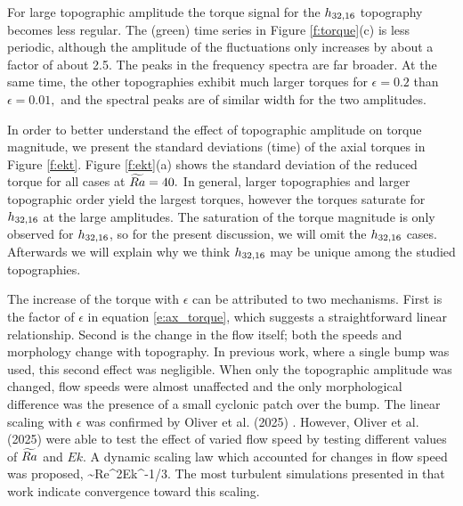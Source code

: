 For large topographic amplitude the torque signal for the $h_{32,16}$ topography becomes less regular.
The (green) time series in Figure \ref{f:torque}(c) is less periodic, although the amplitude of the fluctuations only increases by about a factor of about 2.5. The peaks in the frequency spectra are far broader. 
At the same time, the other topographies exhibit much larger torques for $\epsilon  = 0.2$ than $\epsilon  = 0.01,$ and the spectral peaks are of similar width for the two amplitudes.

In order to better understand the effect of topographic amplitude on torque magnitude, we present the standard deviations (time) of the axial torques in Figure \ref{f:ekt}. 
Figure \ref{f:ekt}(a) shows the standard deviation of the reduced torque for all cases at $\widetilde{Ra} = 40.$ In general, larger topographies and larger topographic order yield the largest torques, however the torques saturate for $h_{32,16}$ at the large amplitudes. The saturation of the torque magnitude is only observed for $h_{32,16}$, so for the present discussion, we will omit the $h_{32,16}$ cases. Afterwards we will explain why we think $h_{32,16}$ may be unique among the studied topographies. 

The increase of the torque with $\epsilon$ can be attributed to two mechanisms. First is the factor of $\epsilon$ in equation \eqref{e:ax_torque}, which suggests a straightforward linear relationship. Second is the change in the flow itself; both the speeds and morphology change with topography. 
In previous work, where a single bump was used, this second effect was negligible. When only the topographic amplitude was changed, flow speeds were almost unaffected and the only morphological difference was the presence of a small cyclonic patch over the bump. The linear scaling with $\epsilon$ was confirmed by Oliver et al. (2025) \citep{tO25}. 
However, Oliver et al. (2025) \citep{tO25} were able to test the effect of varied flow speed by testing different values of $\widetilde{Ra}$ and $Ek.$ A dynamic scaling law which accounted for changes in flow speed was proposed, 
\be
\Gstd \sim \epsilon\;Re^{2}Ek^{-1/3}.
\label{e:tq_dynamic}
\ee
The most turbulent simulations presented in that work indicate convergence toward this scaling. 


